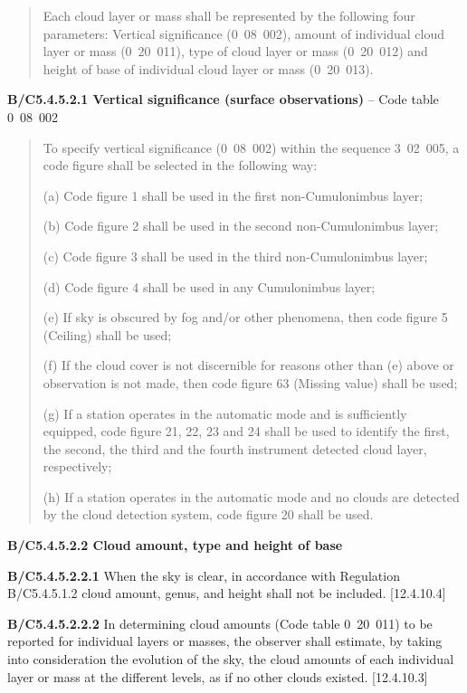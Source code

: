 \begin{quote}
Each cloud layer or mass shall be represented by the following four parameters: Vertical significance (0~08~002), amount of individual cloud layer or mass (0~20~011), type of cloud layer or mass (0~20~012) and height of base of individual cloud layer or mass (0~20~013).
\end{quote}

\textbf{B/C5.4.5.2.1 Vertical significance (surface observations)} -- Code table 0~08~002

\begin{quote}
To specify vertical significance (0~08~002) within the sequence 3~02~005, a code figure shall be selected in the following way:

(a) Code figure 1 shall be used in the first non-Cumulonimbus layer;

(b) Code figure 2 shall be used in the second non-Cumulonimbus layer;

(c) Code figure 3 shall be used in the third non-Cumulonimbus layer;

(d) Code figure 4 shall be used in any Cumulonimbus layer;

(e) If sky is obscured by fog and/or other phenomena, then code figure 5 (Ceiling) shall be used;

(f) If the cloud cover is not discernible for reasons other than (e) above or observation is not made, then code figure 63 (Missing value) shall be used;

(g) If a station operates in the automatic mode and is sufficiently equipped, code figure 21, 22, 23 and 24 shall be used to identify the first, the second, the third and the fourth instrument detected cloud layer, respectively;

(h) If a station operates in the automatic mode and no clouds are detected by the cloud detection system, code figure 20 shall be used.
\end{quote}

\textbf{B/C5.4.5.2.2 Cloud amount, type and height of base}

\textbf{B/C5.4.5.2.2.1} When the sky is clear, in accordance with Regulation B/C5.4.5.1.2 cloud amount, genus, and height shall not be included. {[}12.4.10.4{]}

\textbf{B/C5.4.5.2.2.2} In determining cloud amounts (Code table 0~20~011) to be reported for individual layers or masses, the observer shall estimate, by taking into consideration the evolution of the sky, the cloud amounts of each individual layer or mass at the different levels, as if no other clouds existed. {[}12.4.10.3{]}

